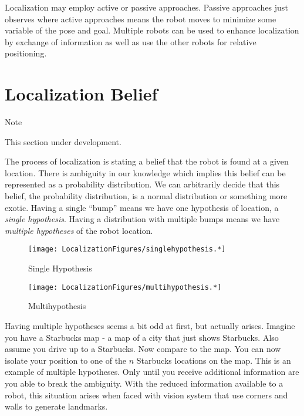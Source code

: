 Localization may employ active or passive approaches. Passive approaches
just observes where active approaches means the robot moves to minimize
some variable of the pose and goal. Multiple robots can be used to
enhance localization by exchange of information as well as use the other
robots for relative positioning.

\hypertarget{localization-belief}{%
\section{Localization Belief}\label{localization-belief}}

Note

This section under development.

The process of localization is stating a belief that the robot is found
at a given location. There is ambiguity in our knowledge which implies
this belief can be represented as a probability distribution. We can
arbitrarily decide that this belief, the probability distribution, is a
normal distribution or something more exotic. Having a single ``bump''
means we have one hypothesis of location, a \emph{single hypothesis}.
Having a distribution with multiple bumps means we have \emph{multiple
hypotheses} of the robot location.

\begin{figure}
\centering
\texttt{[image: LocalizationFigures/singlehypothesis.*]}
\caption{Single Hypothesis}
\end{figure}

\begin{figure}
\centering
\texttt{[image: LocalizationFigures/multihypothesis.*]}
\caption{Multihypothesis}
\end{figure}

Having multiple hypotheses seems a bit odd at first, but actually
arises. Imagine you have a Starbucks map - a map of a city that just
shows Starbucks. Also assume you drive up to a Starbucks. Now compare to
the map. You can now isolate your position to one of the \(n\) Starbucks
locations on the map. This is an example of multiple hypotheses. Only
until you receive additional information are you able to break the
ambiguity. With the reduced information available to a robot, this
situation arises when faced with vision system that use corners and
walls to generate landmarks.
